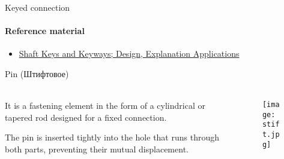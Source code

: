 \documentclass[aspectratio=169]{beamer}
\begin{document}
\begin{frame}[t]{Keyed connection}
    \framesubtitle{Reference material}
    \begin{itemize}
        \item \href{https://mechanicalland.com/shaft-keys/}{Shaft Keys and Keyways; Design, Explanation Applications}
    \end{itemize}
\end{frame}


\begin{frame}[t]{Pin (Штифтовое)}
    \framesubtitle{}
    \begin{columns}[T,onlytextwidth]
        \begin{column}{0.49\textwidth}
            It is a fastening element in the form of a cylindrical or tapered rod designed for a fixed connection. 
            
            The pin is inserted tightly into the hole that runs through both parts, preventing their mutual displacement.
        \end{column}
        \begin{column}{0.49\textwidth}
            \begin{figure}[H]
                \centering\texttt{[image: stift.jpg]}
                \label{fig:stift.jpg}
            \end{figure}
        \end{column}
    \end{columns}
\end{frame}
\end{document}

